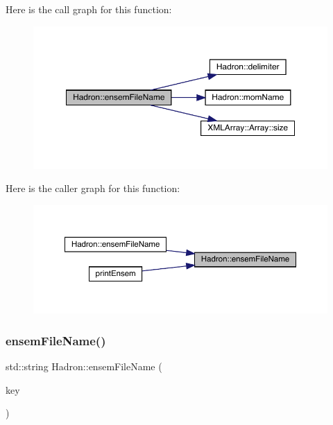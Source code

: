 Here is the call graph for this function\+:
\nopagebreak
\begin{figure}[H]
\begin{center}
\leavevmode
\includegraphics[width=350pt]{d1/daf/namespaceHadron_ae52edd7538c484e9f1c59f65a1d010ca_cgraph}
\end{center}
\end{figure}
Here is the caller graph for this function\+:
\nopagebreak
\begin{figure}[H]
\begin{center}
\leavevmode
\includegraphics[width=350pt]{d1/daf/namespaceHadron_ae52edd7538c484e9f1c59f65a1d010ca_icgraph}
\end{center}
\end{figure}
\mbox{\label{namespaceHadron_af97a705730e771598736c0ddcec48fea}} 
\subsubsection{\texorpdfstring{ensemFileName()}{ensemFileName()}\hspace{0.1cm}{\footnotesize\ttfamily [2/12]}}
{\footnotesize\ttfamily std\+::string Hadron\+::ensem\+File\+Name (\begin{DoxyParamCaption}\item[{const \mbox{\hyperlink{structFF_1_1KeyHadron1PtCorr__t}{F\+F\+::\+Key\+Hadron1\+Pt\+Corr\+\_\+t}} \&}]{key }\end{DoxyParamCaption})}



